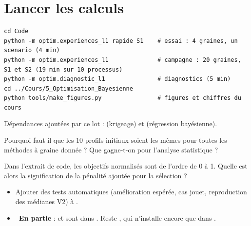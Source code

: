 \section{Lancer les calculs}
\begin{lstlisting}
cd Code
python -m optim.experiences_l1 rapide S1    # essai : 4 graines, un scenario (4 min)
python -m optim.experiences_l1              # campagne : 20 graines, S1 et S2 (19 min sur 10 processus)
python -m optim.diagnostic_l1               # diagnostics (5 min)
cd ../Cours/5_Optimisation_Bayesienne
python tools/make_figures.py                # figures et chiffres du cours
\end{lstlisting}
Dépendances ajoutées par ce lot :  (krigeage) et  (régression bayésienne).

\exercices
\begin{exercice}
Pourquoi faut-il que les 10 profils initiaux soient les mêmes pour toutes les méthodes à graine donnée ? Que gagne-t-on pour l'analyse statistique ?
\end{exercice}
\begin{exercice}
Dans l'extrait de code, les objectifs normalisés  sont de l'ordre de 0 à 1. Quelle est alors la signification de la pénalité  ajoutée pour la sélection  ?
\end{exercice}

\begin{pistes}
\begin{itemize}
\item Ajouter des tests automatiques (amélioration espérée, cas jouet, reproduction des médianes V2) à .
\item {}~\textbf{En partie} :  et  sont dans . Reste , qui n'installe encore que  dans .
\end{itemize}
\end{pistes}
